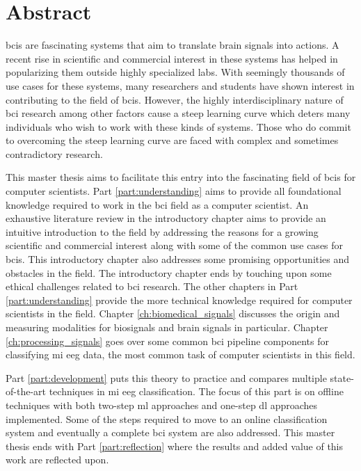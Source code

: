 
\glsresetall

\chapter*{Abstract}
\label{ch:abstract}

\Glspl{bci} are fascinating systems that aim to translate brain signals into actions.
A recent rise in scientific and commercial interest in these systems has helped in popularizing them outside highly specialized labs.
With seemingly thousands of use cases for these systems, many researchers and students have shown interest in contributing to the field of \glspl{bci}.
However, the highly interdisciplinary nature of \gls{bci} research among other factors cause a steep learning curve which deters many individuals who wish to work with these kinds of systems.
Those who do commit to overcoming the steep learning curve are faced with complex and sometimes contradictory research.

This master thesis aims to facilitate this entry into the fascinating field of \glspl{bci} for computer scientists.
Part \ref{part:understanding} aims to provide all foundational knowledge required to work in the \gls{bci} field as a computer scientist.
An exhaustive literature review in the introductory chapter aims to provide an intuitive introduction to the field by addressing the reasons for a growing scientific and commercial interest along with some of the common use cases for \glspl{bci}.
This introductory chapter also addresses some promising opportunities and obstacles in the field.
The introductory chapter ends by touching upon some ethical challenges related to \gls{bci} research.
The other chapters in Part \ref{part:understanding} provide the more technical knowledge required for computer scientists in the field.
Chapter \ref{ch:biomedical_signals} discusses the origin and measuring modalities for \glspl{biosignal} and brain signals in particular.
Chapter \ref{ch:processing_signals} goes over some common \gls{bci} pipeline components for classifying  \gls{mi} \gls{eeg} data, the most common task of computer scientists in this field.

Part \ref{part:development} puts this theory to practice and compares multiple state-of-the-art techniques in \gls{mi} \gls{eeg} classification.
The focus of this part is on offline techniques with both two-step \gls{ml} approaches and one-step \gls{dl} approaches implemented.
Some of the steps required to move to an online classification system and eventually a complete \gls{bci} system are also addressed.
This master thesis ends with Part \ref{part:reflection} where the results and added value of this work are reflected upon.



